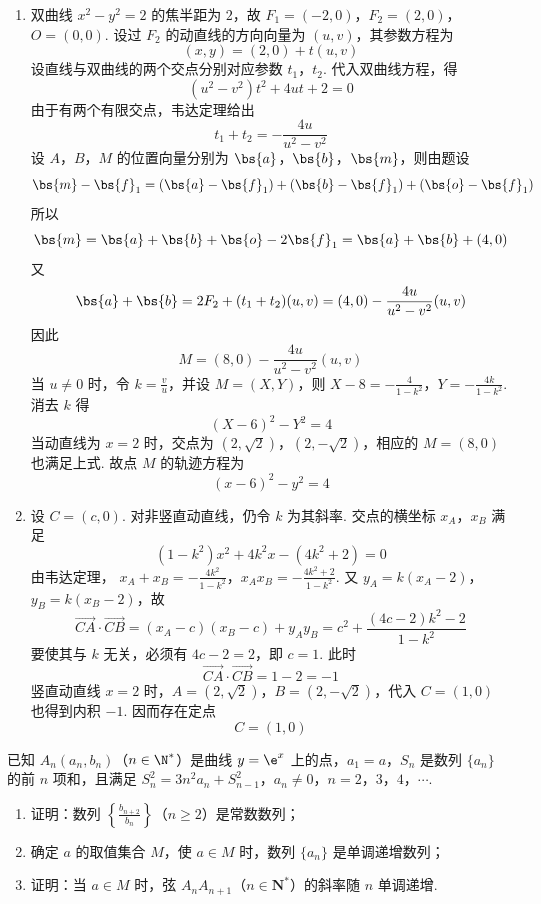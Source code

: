 \begin{solution}
\begin{enumerate}
\item
双曲线 \(x^2-y^2=2\) 的焦半距为 \(2\)，故
\(F_1=(-2,0)\)，\(F_2=(2,0)\)，\(O=(0,0)\).
设过 \(F_2\) 的动直线的方向向量为 \((u,v)\)，其参数方程为
\[
(x,y)=(2,0)+t(u,v)
\]
设直线与双曲线的两个交点分别对应参数 \(t_1\)，\(t_2\). 代入双曲线方程，得
\[
(u^2-v^2)t^2+4ut+2=0
\]
由于有两个有限交点，韦达定理给出
\[
t_1+t_2=-\frac{4u}{u^2-v^2}
\]
设 \(A\)，\(B\)，\(M\) 的位置向量分别为 \(\bs{a}\)，\(\bs{b}\)，\(\bs{m}\)，则由题设
\[
\bs{m}-\bs{f}_1
=(\bs{a}-\bs{f}_1)+(\bs{b}-\bs{f}_1)
 +(\bs{o}-\bs{f}_1)
\]
所以
\[
\bs{m}=\bs{a}+\bs{b}+\bs{o}-2\bs{f}_1
=\bs{a}+\bs{b}+(4,0)
\]
又
\[
\bs{a}+\bs{b}
=2F_2+(t_1+t_2)(u,v)
=(4,0)-\frac{4u}{u^2-v^2}(u,v)
\]
因此
\[
M=(8,0)-\frac{4u}{u^2-v^2}(u,v)
\]
当 \(u\neq0\) 时，令 \(k=\frac{v}{u}\)，并设 \(M=(X,Y)\)，则
\(X-8=-\frac{4}{1-k^2}\)，\(Y=-\frac{4k}{1-k^2}\).
消去 \(k\) 得
\[
(X-6)^2-Y^2=4
\]
当动直线为 \(x=2\) 时，交点为 \((2,\sqrt{2})\)，\((2,-\sqrt{2})\)，相应的 \(M=(8,0)\) 也满足上式. 故点 \(M\) 的轨迹方程为
\[
(x-6)^2-y^2=4
\]

\item
设 \(C=(c,0)\). 对非竖直动直线，仍令 \(k\) 为其斜率. 交点的横坐标 \(x_A\)，\(x_B\) 满足
\[
(1-k^2)x^2+4k^2x-(4k^2+2)=0
\]
由韦达定理，
\(x_A+x_B=-\frac{4k^2}{1-k^2}\)，\(x_Ax_B=-\frac{4k^2+2}{1-k^2}\).
又 \(y_A=k(x_A-2)\)，\(y_B=k(x_B-2)\)，故
\[
\overrightarrow{CA}\cdot\overrightarrow{CB}
=(x_A-c)(x_B-c)+y_Ay_B
=c^2+\frac{(4c-2)k^2-2}{1-k^2}
\]
要使其与 \(k\) 无关，必须有 \(4c-2=2\)，即 \(c=1\). 此时
\[
\overrightarrow{CA}\cdot\overrightarrow{CB}=1-2=-1
\]
竖直动直线 \(x=2\) 时，\(A=(2,\sqrt2)\)，\(B=(2,-\sqrt2)\)，代入 \(C=(1,0)\) 也得到内积 \(-1\). 因而存在定点
\[
C=(1,0)
\]
\end{enumerate}
\end{solution}

\begin{problem}
已知 \(A_{n}(a_{n}, b_{n})\)（\(n \in \N^{*}\)）是曲线 \(y = \e^{x}\) 上的点，\(a_{1} = a\)，\(S_{n}\) 是数列 \(\{a_{n}\}\) 的前 \(n\) 项和，且满足 \(S_{n}^{2} = 3n^{2}a_{n} + S_{n-1}^{2}\)，\(a_{n} \neq 0\)，\(n = 2\)，\(3\)，\(4\)，\(\cdots\).

\begin{enumerate}
\item 证明：数列 \(\left\{\frac{b_{n+2}}{b_n}\right\}\)（\(n \geqslant 2\)）是常数数列；
\item 确定 \(a\) 的取值集合 \(M\)，使 \(a \in M\) 时，数列 \(\{a_n\}\) 是单调递增数列；
\item 证明：当 \(a \in M\) 时，弦 \(A_{n} A_{n+1}\)（\(n \in \mathbf{N}^{*}\)）的斜率随 \(n\) 单调递增.
\end{enumerate}
\end{problem}

